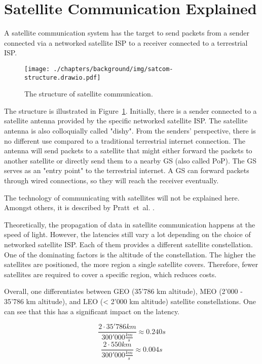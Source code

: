 \section{Satellite Communication Explained} \label{sec:satellite-communication-explained}

A satellite communication system has the target to send packets from a sender connected via a networked satellite ISP to a receiver connected to a terrestrial ISP.

\begin{figure}[!ht]
	\centering
	\texttt{[image: ./chapters/background/img/satcom-structure.drawio.pdf]}
	\caption{The structure of satellite communication.}
	\label{fig:sat-com-explained}
\end{figure}

The structure is illustrated in Figure~\ref{fig:sat-com-explained}.
Initially, there is a sender connected to a satellite antenna provided by the specific networked satellite ISP.
The satellite antenna is also colloquially called "dishy".
From the senders' perspective, there is no different use compared to a traditional terrestrial internet connection.
The antenna will send packets to a satellite that might either forward the packets to another satellite or directly send them
to a nearby \ac{GS} (also called \ac{PoP}). The \ac{GS} serves as an "entry point" to the terrestrial internet.
A \ac{GS} can forward packets through wired connections, so they will reach the receiver eventually.

The technology of communicating with satellites will not be explained here.
Amongst others, it is described by Pratt~et~al. \cite{pratt2019satellite}.

Theoretically, the propagation of data in satellite communication happens at the speed of light.
However, the latencies still vary a lot depending on the choice of networked satellite ISP.
Each of them provides a different satellite constellation. One of the dominating factors is the
altitude of the constellation. The higher the satellites are positioned, the more region a single satellite covers.
Therefore, fewer satellites are required to cover a specific region, which reduces costs.

Overall, one differentiates between \ac{GEO} (35'786 km altitude), \ac{MEO} (2'000 - 35'786 km altitude), and \ac{LEO} (< 2'000 km altitude) satellite constellations.
One can see that this has a significant impact on the latency.

\begin{equation}
	\frac{2 \cdot 35'786 km}{300'000 \frac{km}{s}} \approx 0.240 s
	\label{eq:geo-min-latency}
\end{equation}
\begin{equation}
	\frac{2 \cdot 550 km}{300'000 \frac{km}{s}} \approx 0.004 s
	\label{eq:starlink-min-latency}
\end{equation}

